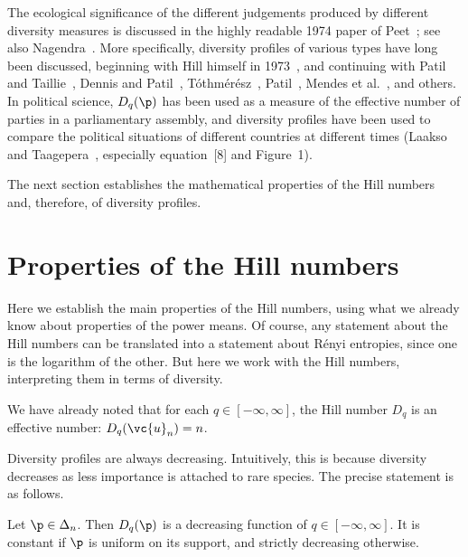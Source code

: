 The ecological significance of the different judgements produced by
different diversity measures is discussed in the highly readable 1974 paper
of Peet~\cite{Peet}; see also Nagendra~\cite{Nage}.  More specifically,
diversity profiles of various types have long been discussed, beginning
with Hill%
%
%
himself in 1973~\cite{Hill}, and continuing with Patil%
%
% 
and Taillie~\cite{PaTaSDP,PaTaDCM}, Dennis and Patil~\cite{DePa},
T\'othm\'er\'esz~\cite{TothCDM}, Patil~\cite{PatiDP}, Mendes et
al.~\cite{META}, and others.
% 
In political%
%
% 
science, $D_q(\p)$ has been used as a measure of the effective%
%
%
number of parties in a parliamentary assembly, and diversity profiles have
been used to compare the political situations of different countries at 
different times (Laakso and Taagepera~\cite{LaTa}, especially
equation~[8] and Figure~1).

The next section establishes the mathematical
properties of the Hill numbers and, therefore, of diversity profiles.


\section{Properties of the Hill numbers}


Here we establish the main properties of the Hill numbers, using what we
already know about properties of the power means.  Of course, any statement
about the Hill numbers can be translated into a statement about R\'enyi
entropies, since one is the logarithm of the other.  But here we work with
the Hill numbers, interpreting them in terms of diversity.

We have already noted that for each $q \in [-\infty, \infty]$, the Hill
number $D_q$ is an effective number: $D_q(\vc{u}_n) = n$.

Diversity profiles are always decreasing.  Intuitively, this is because
diversity decreases as less importance is attached to rare species.  The
precise statement is as follows.

\begin{propn}
% 
Let $\p \in \Delta_n$.  Then $D_q(\p)$ is a decreasing function of $q \in
[-\infty, \infty]$.  It is constant if $\p$ is uniform on its support, and
strictly decreasing otherwise.
\end{propn}

